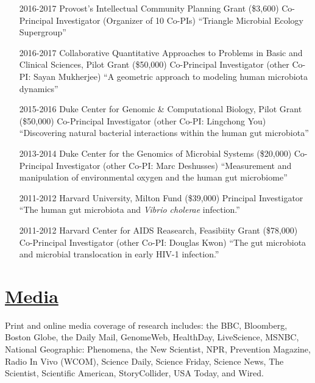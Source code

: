 \documentclass[overlapped,line,11pt]{res}
\begin{document}
\begin{resume}
\begin{itemize}[leftmargin=2cm, style=sameline]
\item[2016-2017]  Provost's Intellectual Community Planning Grant
  (\$3,600) \newline Co-Principal Investigator (Organizer of 10 Co-PIs) \newline ``Triangle Microbial Ecology Supergroup''

\item[2016-2017]  Collaborative Quantitative Approaches to Problems in Basic and Clinical Sciences, Pilot Grant
  (\$50,000) \newline Co-Principal Investigator (other Co-PI:
  Sayan Mukherjee) \newline ``A geometric approach to modeling human microbiota dynamics''

\item[2015-2016] Duke Center for Genomic \& Computational Biology, Pilot Grant
  (\$50,000) \newline Co-Principal Investigator (other Co-PI:
  Lingchong You) \newline ``Discovering natural bacterial interactions
  within the human gut microbiota''

\item[2013-2014] Duke Center for the Genomics of Microbial Systems
  (\$20,000) \newline Co-Principal Investigator (other Co-PI:
  Marc Deshusses) \newline ``Measurement and manipulation of
environmental oxygen and the human gut microbiome''

\item[2011-2012] Harvard University, Milton Fund (\$39,000) \newline
  Principal Investigator \newline ``The human gut microbiota
  and \emph{Vibrio cholerae} infection.''

\item[2011-2012] Harvard Center for AIDS Reasearch, Feasibiity Grant (\$78,000) \newline
  Co-Principal Investigator (other Co-PI: Douglas Kwon) \newline ``The gut microbiota and microbial
translocation in early HIV-1 infection.''

\end{itemize}

\section{\underline{\sc Media}} 
\vspace{.05in} Print and online media coverage of research includes:
the BBC, Bloomberg, Boston Globe, the Daily Mail, GenomeWeb,
HealthDay, LiveScience, MSNBC, National Geographic: Phenomena, the New
Scientist, NPR, Prevention Magazine, Radio In Vivo (WCOM), Science
Daily, Science Friday, Science News, The Scientist, Scientific
American, StoryCollider, USA Today, and Wired.


\end{resume}
\end{document}
